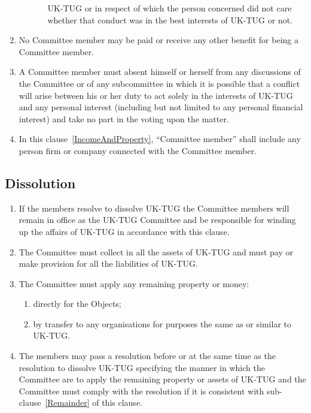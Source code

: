 \documentclass[a4paper,11pt]{article}
\begin{document}
\begin{enumerate}
\begin{enumerate}
\begin{enumerate}
  UK-TUG or in respect of which the person concerned did not care whether that
  conduct was in the best interests of UK-TUG or not.
\end{enumerate}
\end{enumerate}
\item No Committee member may be paid or receive any other benefit for being a
  Committee member.
\item \label{ConflictOfInterest} A Committee member must absent himself or herself from any discussions of
  the Committee or of any subcommittee in which it is possible that a conflict will arise between his
  or her duty to act solely in the interests of UK-TUG and any personal interest
  (including but not limited to any personal financial interest) and take no
  part in the voting upon the matter.
\item In this clause~\ref{IncomeAndProperty}, ``Committee member'' shall include any person firm or
  company connected with the Committee member.
\end{enumerate}

\subsection{Dissolution}

\begin{enumerate}
\item If the members resolve to dissolve UK-TUG the Committee members will
  remain in office as the UK-TUG Committee and be responsible for winding up the
  affairs of UK-TUG in accordance with this clause.
\item The Committee must collect in all the assets of UK-TUG and must pay or
  make provision for all the liabilities of UK-TUG.
\item \label{Remainder} The Committee must apply any remaining property or money:
\begin{enumerate}
\item directly for the Objects;
\item by transfer to any organisations for purposes the same as or
  similar to UK-TUG.
\end{enumerate}
\item The members may pass a resolution before or at the same time as the
  resolution to dissolve UK-TUG specifying the manner in which the Committee are
  to apply the remaining property or assets of UK-TUG and the Committee must
  comply with the resolution if it is consistent with sub-clause~\ref{Remainder} of this clause.
\end{enumerate}
\end{document}
